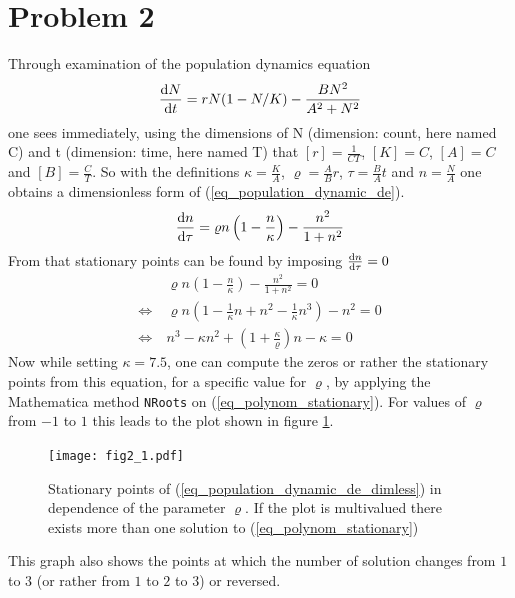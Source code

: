 \documentclass[12pt, a4paper]{article}
\begin{document}
  \section*{Problem 2}
  Through examination of the population dynamics equation
  \begin{align}
    \frac{{\rm d} N}{{\rm d} t} = r N (1 - N / K) - \frac{B N^2}{A^2+N^2}
    \label{eq_population_dynamic_de}
  \end{align}
  one sees immediately, using the dimensions of N (dimension: count, here named C) and t (dimension: time, here named T) that $[r] = \frac{1}{C T}$, $[K] = C$, $[A] = C$ and $[B] = \frac{C}{T}$. So with the definitions $\kappa = \frac{K}{A}$, $\varrho = \frac{A}{B} r$, $\tau = \frac{B}{A} t$ and $n = \frac{N}{A}$ one obtains a dimensionless form of (\ref{eq_population_dynamic_de}).
  \begin{align}
    \frac{{\rm d} n}{{\rm d} \tau} = \varrho n \left(1 - \frac{n}{\kappa} \right)
      - \frac{n^2}{1 + n^2}
    \label{eq_population_dynamic_de_dimless}
  \end{align}
  From that stationary points can be found by imposing $\frac{{\rm d} n}{{\rm d} \tau} = 0$
  \begin{align}
    & \varrho n \left(1 - \frac{n}{\kappa} \right)
      - \frac{n^2}{1 + n^2} = 0 \nonumber \\
    \Leftrightarrow \ & \varrho n \left(1 - \frac{1}{\kappa} n + n^2
      - \frac{1}{\kappa} n^3 \right) - n^2 = 0 \nonumber \\
    \Leftrightarrow \ & n^3 - \kappa n^2
      + \left(1 + \frac{\kappa}{\varrho}\right) n - \kappa = 0
    \label{eq_polynom_stationary}
  \end{align}
  Now while setting $\kappa = 7.5$, one can compute the zeros or rather the stationary points from this equation, for a specific value for $\varrho$, by applying the Mathematica method \texttt{NRoots} on (\ref{eq_polynom_stationary}). For values of $\varrho$ from $-1$ to $1$ this leads to the plot shown in figure \ref{fig_stationary_points}.

  \begin{figure}
    \centering
    \texttt{[image: fig2\_1.pdf]}
    \caption{Stationary points of (\ref{eq_population_dynamic_de_dimless}) in dependence of the parameter $\varrho$. If the plot is multivalued there exists more than one solution to (\ref{eq_polynom_stationary})}
    \label{fig_stationary_points}
  \end{figure}

  This graph also shows the points at which the number of solution changes from $1$ to $3$ (or rather from $1$ to $2$ to $3$) or reversed.
\end{document}

